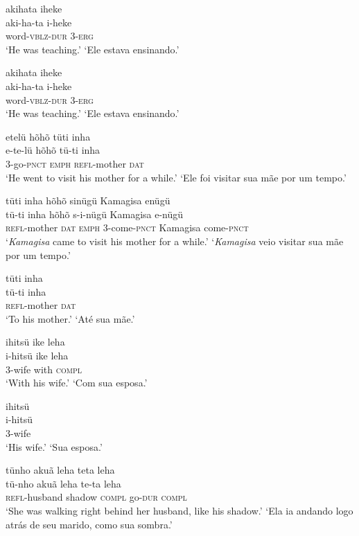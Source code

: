 \documentclass[output=paper,
modfonts,nonflat
]{langsci/langscibook}
\begin{document}
\ea  akihata iheke\\[.3em]
\gll aki-ha-ta i-heke\\
     word-\textsc{vblz}-\textsc{dur} 3-\textsc{erg}\\
\glt ‘He was teaching.’
\glt ‘Ele estava ensinando.’
\z

\ea  akihata iheke\\[.3em]
\gll aki-ha-ta i-heke\\
     word-\textsc{vblz}-\textsc{dur} 3-\textsc{erg}\\
\glt ‘He was teaching.’
\glt ‘Ele estava ensinando.’
\z

\ea  etelü hõhõ tüti inha\\[.3em]
\gll e-te-lü hõhõ tü-ti inha\\
     3-go-\textsc{pnct} \textsc{emph} \textsc{refl}-mother \textsc{dat}\\
\glt ‘He went to visit his mother for a while.’
\glt ‘Ele foi visitar sua mãe por um tempo.’
\z

\ea  tüti inha hõhõ sinügü Kamagisa enügü\\[.3em]
\gll tü-ti inha hõhõ s-i-nügü Kamagisa e-nügü\\
     \textsc{refl}-mother \textsc{dat} \textsc{emph} 3-come-\textsc{pnct} Kamagisa come-\textsc{pnct}\\
\glt ‘\textit{Kamagisa} came to visit his mother for a while.’
\glt ‘\textit{Kamagisa} veio visitar sua mãe por um tempo.’
\z

\ea  tüti inha\\[.3em]
\gll tü-ti inha\\
     \textsc{refl}-mother \textsc{dat}\\
\glt ‘To his mother.’
\glt ‘Até sua mãe.’
\z

\ea  ihitsü ike leha\\[.3em]
\gll i-hitsü ike leha\\
     3-wife with \textsc{compl}\\
\glt ‘With his wife.’
\glt ‘Com sua esposa.’
\z

\ea  ihitsü\\[.3em]
\gll i-hitsü\\
     3-wife\\
\glt ‘His wife.’
\glt ‘Sua esposa.’
\z

\ea  tünho akuã leha teta leha\\[.3em]
\gll tü-nho akuã leha te-ta leha\\
     \textsc{refl}-husband shadow \textsc{compl} go-\textsc{dur} \textsc{compl}\\
\glt ‘She was walking right behind her husband, like his shadow.’
\glt ‘Ela ia andando logo atrás de seu marido, como sua sombra.’
\z
\end{document}
